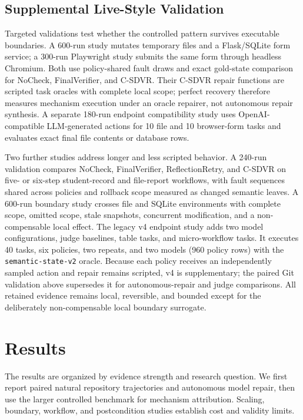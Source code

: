 \documentclass[pdflatex,sn-apa]{sn-jnl}
\begin{document}
\subsection{Supplemental Live-Style Validation}

Targeted validations test whether the controlled pattern survives executable boundaries. A 600-run study mutates temporary files and a Flask/SQLite form service; a 300-run Playwright study submits the same form through headless Chromium. Both use policy-shared fault draws and exact gold-state comparison for NoCheck, FinalVerifier, and C-SDVR. Their C-SDVR repair functions are scripted task oracles with complete local scope; perfect recovery therefore measures mechanism execution under an oracle repairer, not autonomous repair synthesis. A separate 180-run endpoint compatibility study uses OpenAI-compatible LLM-generated actions for 10 file and 10 browser-form tasks and evaluates exact final file contents or database rows.

Two further studies address longer and less scripted behavior. A 240-run validation compares NoCheck, FinalVerifier, ReflectionRetry, and C-SDVR on five- or six-step student-record and file-report workflows, with fault sequences shared across policies and rollback scope measured as changed semantic leaves. A 600-run boundary study crosses file and SQLite environments with complete scope, omitted scope, stale snapshots, concurrent modification, and a non-compensable local effect. The legacy v4 endpoint study adds two model configurations, judge baselines, table tasks, and micro-workflow tasks. It executes 40 tasks, six policies, two repeats, and two models (960 policy rows) with the \texttt{semantic-state-v2} oracle. Because each policy receives an independently sampled action and repair remains scripted, v4 is supplementary; the paired Git validation above supersedes it for autonomous-repair and judge comparisons. All retained evidence remains local, reversible, and bounded except for the deliberately non-compensable local boundary surrogate.

\section{Results}

The results are organized by evidence strength and research question. We first report paired natural repository trajectories and autonomous model repair, then use the larger controlled benchmark for mechanism attribution. Scaling, boundary, workflow, and postcondition studies establish cost and validity limits.
\end{document}
